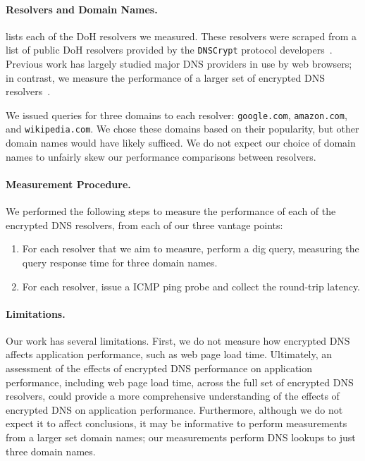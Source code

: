 \paragraph{Resolvers and Domain Names.}  lists each of 
the DoH resolvers we measured.  These resolvers were
scraped from a list of public DoH resolvers provided by the \texttt{DNSCrypt}
protocol developers~\cite{dnscrypt-public-resolvers}.  Previous work has
largely studied major DNS providers in use by web browsers; in contrast, we
measure the performance of a larger set of encrypted DNS resolvers~\cite{hounsel2020comparing,hounsel2021can,hoang2020k,lu2019end-to-end}.

We issued queries for three domains to each resolver: \texttt{google.com}, 
\texttt{amazon.com}, and \texttt{wikipedia.com}.  We chose these domains based on their popularity, but
other domain names would have likely sufficed.  We do not expect our choice of
domain names to unfairly skew our performance comparisons between resolvers.

\paragraph{Measurement Procedure.} We performed the following steps to measure
the performance of each of the encrypted DNS resolvers, from each of our three vantage points:
\begin{enumerate} 
        \item For each resolver that we aim to measure, perform a dig query, measuring the query response time for three
            domain names.
    \item For each resolver, issue a ICMP ping
            probe and collect the round-trip latency. 
\end{enumerate}

\paragraph{Limitations.} Our work has several limitations.
First, we do not measure how encrypted DNS affects application
performance, such as web page load time. Ultimately, an assessment of the
effects of encrypted DNS performance on application performance, including web
page load time, across the full set of encrypted DNS resolvers, could provide
a more comprehensive understanding of the effects of encrypted DNS on
application performance. Furthermore, although we do not expect it to affect conclusions, it may
be informative to perform measurements from a larger set domain names; our
measurements perform DNS lookups to just three domain names.
